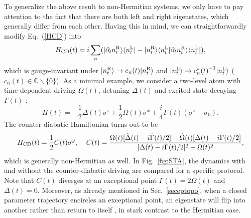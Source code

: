 \documentclass{tADP2e}
\theoremstyle{plain}
\theoremstyle{plain}
\theoremstyle{definition}
\begin{document}
To generalize the above result to non-Hermitian systems, we only have to pay attention to the fact that there are both left and right eigenstates, which generally differ from each other. Having this in mind, we can straightforwardly modify Eq.~(\ref{HCD}) into 
\begin{equation}
H_{\rm CD}(t)=i\sum_n(|\partial_t n^{\rm R}_t\rangle \langle n^{\rm L}_t| - |n^{\rm R}_t\rangle\langle n^{\rm L}_t|\partial_t n^{\rm R}_t\rangle\langle n^{\rm L}_t|),
\label{NHHCD}
\end{equation}
which is gauge-invariant under $|n^{\rm R}_t\rangle\to c_n(t)|n^{\rm R}_t\rangle$ and $|n^{\rm L}_t\rangle\to {c^*_n(t)}^{-1}|n^{\rm L}_t\rangle$ ($c_n(t)\in\mathbb{C}\backslash\{0\}$). As a minimal example, we consider a two-level atom with time-dependent driving $\Omega(t)$, detuning $\Delta(t)$ and excited-state decaying $\Gamma(t)$ \cite{IS11,TBT13}:
\begin{equation}
H(t)=-\frac{1}{2}\Delta(t)\sigma^z+\frac{1}{2}\Omega(t)\sigma^x+\frac{i}{4}\Gamma(t)(\sigma^z-\sigma_0).
\label{TLH}
\end{equation}
The counter-diabatic Hamiltonian turns out to be
\begin{equation}
H_{\rm CD}(t)=\frac{1}{2}C(t)\sigma^y,\;\;\;\;C(t)=\frac{\Omega(t)[\dot\Delta(t)-i\dot\Gamma(t)/2]-\dot\Omega(t)[\Delta(t)-i\Gamma(t)/2]}{[\Delta(t)-i\Gamma(t)/2]^2+\Omega(t)^2},
\label{TLHCD}
\end{equation}
which is generally non-Hermitian as well. In Fig.~\ref{fig:STA}, the dynamics with and without the counter-diabatic driving are compared for a specific protocol. Note that $C(t)$ diverges at an exceptional point $\Gamma(t)=2\Omega(t)$ and $\Delta(t)=0$. Moreover, as already mentioned in Sec.~\ref{seceptopo}, when a closed parameter trajectory encircles an exceptional point, an eigenstate will flip into another rather than return to itself \cite{RU11,MVB11}, in stark contrast to the Hermitian case. 
\end{document}
